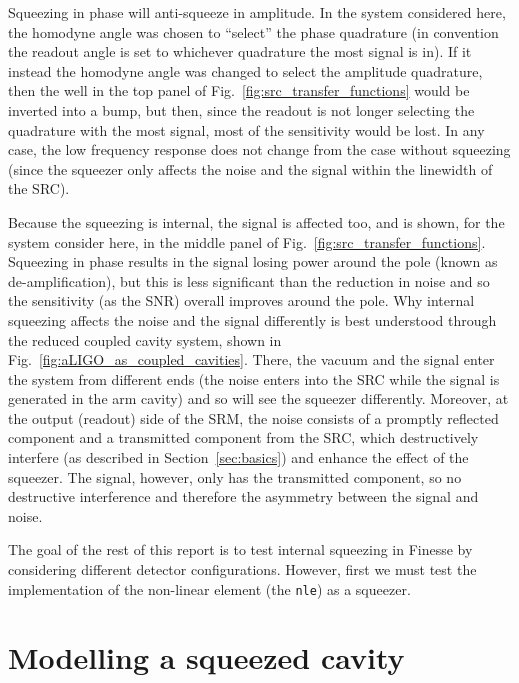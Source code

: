 \documentclass[aps,pra,superscriptaddress,reprint,nofootinbib]{revtex4-1}
\newcommand{\code}[1]{\texttt{#1}}
\begin{document}
Squeezing in phase will anti-squeeze in amplitude. In the system considered here, the homodyne angle was chosen to ``select'' the phase quadrature (in convention the readout angle is set to whichever quadrature the most signal is in). If it instead the homodyne angle was changed to select the amplitude quadrature, then the well in the top panel of Fig.~\ref{fig:src_transfer_functions} would be inverted into a bump, but then, since the readout is not longer selecting the quadrature with the most signal, most of the sensitivity would be lost. In any case, the low frequency response does not change from the case without squeezing (since the squeezer only affects the noise and the signal within the linewidth of the SRC).

Because the squeezing is internal, the signal is affected too, and is shown, for the system consider here, in the middle panel of Fig.~\ref{fig:src_transfer_functions}. Squeezing in phase results in the signal losing power around the pole (known as de-amplification), but this is less significant than the reduction in noise and so the sensitivity (as the SNR) overall improves around the pole.
Why internal squeezing affects the noise and the signal differently is best understood through the reduced coupled cavity system, shown in Fig.~\ref{fig:aLIGO_as_coupled_cavities}. There, the vacuum and the signal enter the system from different ends (the noise enters into the SRC while the signal is generated in the arm cavity) and so will see the squeezer differently. Moreover, at the output (readout) side of the SRM, the noise consists of a promptly reflected component and a transmitted component from the SRC, which destructively interfere (as described in Section~\ref{sec:basics}) and enhance the effect of the squeezer. The signal, however, only has the transmitted component, so no destructive interference and therefore the asymmetry between the signal and noise.


The goal of the rest of this report is to test internal squeezing in Finesse by considering different detector configurations. However, first we must test the implementation of the non-linear element (the \code{nle}) as a squeezer.


\section{Modelling a squeezed cavity} %
\label{sec:sqzcavity}
\end{document}
